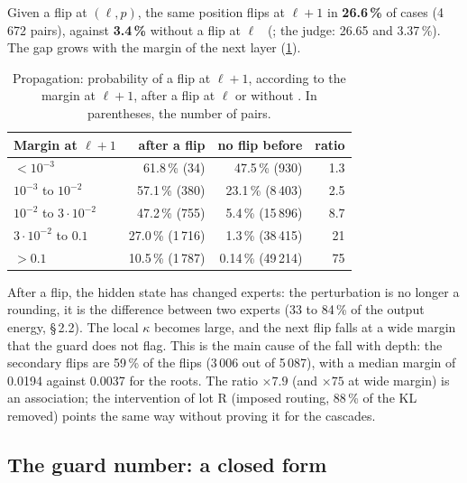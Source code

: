 Given a flip at $(\ell, p)$, the same position flips at $\ell + 1$ in \textbf{26.6\,\%} of cases (4\,672 pairs), against \textbf{3.4\,\%} without a flip at $\ell$ \mes~(; the judge: 26.65 and 3.37\,\%). The gap grows with the margin of the next layer (\cref{t3tro:tab:propagation}).

\begin{table}[tbp]
\centering\small
\caption[The propagation of flips]{Propagation: probability of a flip at $\ell + 1$, according to the margin at $\ell + 1$, after a flip at $\ell$ or without \mes. In parentheses, the number of pairs.}
\label{t3tro:tab:propagation}
\begin{tabular}{@{}lrrr@{}}
\toprule
Margin at $\ell + 1$ & after a flip & no flip before & ratio \\
\midrule
$< 10^{-3}$ & 61.8\,\% (34) & 47.5\,\% (930) & 1.3 \\
$10^{-3}$ to $10^{-2}$ & 57.1\,\% (380) & 23.1\,\% (8\,403) & 2.5 \\
$10^{-2}$ to $3 \cdot 10^{-2}$ & 47.2\,\% (755) & 5.4\,\% (15\,896) & 8.7 \\
$3 \cdot 10^{-2}$ to $0.1$ & 27.0\,\% (1\,716) & 1.3\,\% (38\,415) & 21 \\
$> 0.1$ & 10.5\,\% (1\,787) & 0.14\,\% (49\,214) & 75 \\
\bottomrule
\end{tabular}
\end{table}

After a flip, the hidden state has changed experts: the perturbation is no longer a rounding, it is the difference between two experts (33 to 84\,\% of the output energy,  §\,2.2). The local $\kappa$ becomes large, and the next flip falls at a wide margin that the guard does not flag. This is the main cause of the fall with depth: the secondary flips are 59\,\% of the flips (3\,006 out of 5\,087), with a median margin of 0.0194 against 0.0037 for the roots. The ratio $\times 7.9$ (and $\times 75$ at wide margin) is an association; the intervention of lot R (imposed routing, 88\,\% of the KL removed) points the same way without proving it for the cascades.

\subsection{The guard number: a closed form}\label{t3tro:sec:theoreme}

